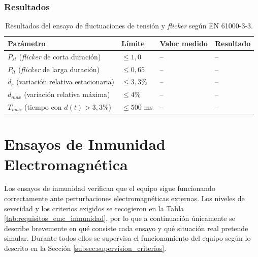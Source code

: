 \subsubsection*{Resultados}

\begin{table}[!h]
\centering
\small
\begin{tabular}{|p{5.8cm}|p{2.6cm}|p{2.6cm}|p{2.2cm}|}
\hline
\textbf{Parámetro} & \textbf{Límite} & \textbf{Valor medido} & \textbf{Resultado} \\ \hline
$P_{st}$ (\textit{flicker} de corta duración) & $\leq 1,0$ & -- & -- \\ \hline
$P_{lt}$ (\textit{flicker} de larga duración) & $\leq 0,65$ & -- & -- \\ \hline
$d_c$ (variación relativa estacionaria) & $\leq 3,3\%$ & -- & -- \\ \hline
$d_{max}$ (variación relativa máxima) & $\leq 4\%$ & -- & -- \\ \hline
$T_{max}$ (tiempo con $d(t) > 3,3\%$) & $\leq 500$ ms & -- & -- \\ \hline
\end{tabular}
\caption{Resultados del ensayo de fluctuaciones de tensión y \textit{flicker} según EN 61000-3-3.}
\label{tab:resultados_flicker}
\end{table}

\section{Ensayos de Inmunidad Electromagnética}
\label{sec:ensayos_inmunidad}

Los ensayos de inmunidad verifican que el equipo sigue funcionando correctamente ante perturbaciones electromagnéticas externas. Los niveles de severidad y los criterios exigidos se recogieron en la Tabla \ref{tab:requisitos_emc_inmunidad}, por lo que a continuación únicamente se describe brevemente en qué consiste cada ensayo y qué situación real pretende simular. Durante todos ellos se supervisa el funcionamiento del equipo según lo descrito en la Sección \ref{subsec:supervision_criterios}.


